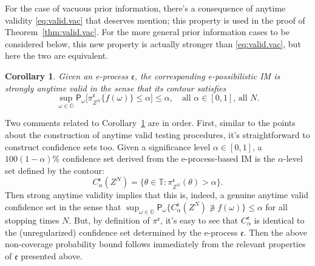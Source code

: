 \documentclass[a4paper, 12pt]{article}
\theoremstyle{plain}
\newtheorem{cor}{Corollary}
\theoremstyle{definition}
\theoremstyle{remark}
\newcommand{\prob}{\mathsf{P}}
\newcommand{\OO}{\mathbb{O}}
\newcommand{\TT}{\mathbb{T}}
\newcommand{\eval}{\mathfrak{e}}
\begin{document}
For the case of vacuous prior information, there's a consequence of anytime validity \eqref{eq:valid.vac} that deserves mention; this property is used in the proof of Theorem~\ref{thm:valid.vac}.  For the more general prior information cases to be considered below, this new property is actually stronger than \eqref{eq:valid.vac}, but here the two are equivalent.  

\begin{cor}
\label{cor:strong.valid.vac}
Given an e-process $\eval$, the corresponding e-possibilistic IM is strongly anytime valid in the sense that its contour satisfies 
\begin{equation}
\label{eq:strong.valid.vac}
\sup_{\omega \in \OO} \prob_\omega\bigl[ \pi_{Z^N}^\eval\{ f(\omega) \} \leq \alpha \bigr] \leq \alpha, \quad \text{all $\alpha \in [0,1]$, all $N$}.
\end{equation}
\end{cor}


Two comments related to Corollary~\ref{cor:strong.valid.vac} are in order.  First, similar to the points about the construction of anytime valid testing procedures, it's straightforward to construct confidence sets too.  Given a significance level $\alpha \in [0,1]$, a $100(1-\alpha)$\% confidence set derived from the e-process-based IM is the $\alpha$-level set defined by the contour:
\[ C_\alpha^\eval(Z^N) = \{ \theta \in \TT: \pi_{Z^N}^\eval(\theta) > \alpha\}. \]
Then strong anytime validity implies that this is, indeed, a genuine anytime valid confidence set in the sense that $\sup_{\omega \in \OO} \prob_\omega\{ C_\alpha^\eval(Z^N) \not\ni f(\omega) \} \leq \alpha$ for all stopping times $N$.
But, by definition of $\pi^\eval$, it's easy to see that $C_\alpha^\eval$ is identical to
the (unregularized) confidence set determined by the e-process $\eval$.  Then the above non-coverage probability bound follows immediately from the relevant properties of $\eval$ presented above.  
\end{document}
